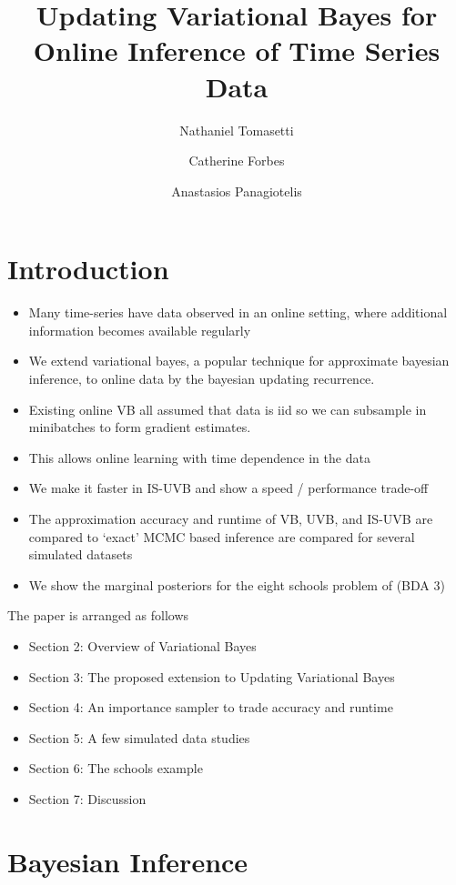 \documentclass[12pt,a4paper]{article}\usepackage[]{graphicx}\usepackage[]{color}
\title{Updating Variational Bayes for Online Inference of Time Series Data}
\author{Nathaniel Tomasetti 
\and Catherine Forbes
\and Anastasios Panagiotelis}
\begin{document}
\maketitle



\section{Introduction}
\label{sec:intro}

\begin{itemize}
\item Many time-series have data observed in an online setting, where additional information becomes available regularly
\item We extend variational bayes, a popular technique for approximate bayesian inference, to online data by the bayesian updating recurrence.
\item Existing online VB all assumed that data is iid so we can subsample in minibatches to form gradient estimates.
\item This allows online learning with time dependence in the data
\item We make it faster in IS-UVB and show a speed / performance trade-off
\item The approximation accuracy and runtime of VB, UVB, and IS-UVB are compared to `exact' MCMC based inference are compared for several simulated datasets
\item We show the marginal posteriors for the eight schools problem of \cite{Gelman2014} (BDA 3)
\end{itemize}
The paper is arranged as follows
\begin{itemize}
\item Section 2: Overview of Variational Bayes
\item Section 3: The proposed extension to Updating Variational Bayes
\item Section 4: An importance sampler to trade accuracy and runtime
\item Section 5: A few simulated data studies
\item Section 6: The schools example
\item Section 7: Discussion
\end{itemize}




\section{Bayesian Inference}
\label{sec:Inference}
\end{document}
